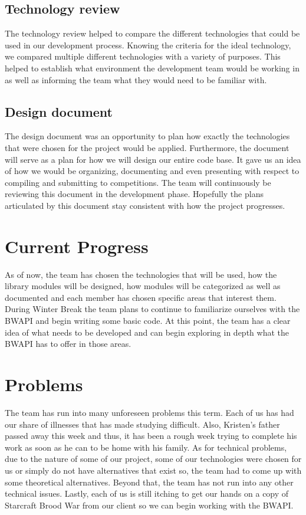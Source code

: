\documentclass[10pt,letterpaper,onecolumn,draftclsnofoot]{IEEEtran}
\begin{document}
\subsection{Technology review}
The technology review helped to compare the different technologies that could be used in our development process. Knowing the criteria for the ideal technology, we compared multiple different technologies with a variety of purposes. This helped to establish what environment the development team would be working in as well as informing the team what they would need to be familiar with.

\subsection{Design document}
The design document was an opportunity to plan how exactly the technologies that were chosen for the project would be applied. Furthermore, the document will serve as a plan for how we will design our entire code base. It gave us an idea of how we would be organizing, documenting and even presenting with respect to compiling and submitting to competitions. The team will continuously be reviewing this document in the development phase. Hopefully the plans articulated by this document stay consistent with how the project progresses. 

\section{Current Progress}
As of now, the team has chosen the technologies that will be used, how the library modules will be designed, how modules will be categorized as well as documented and each member has chosen specific areas that interest them. During Winter Break the team plans to continue to familiarize ourselves with the BWAPI and begin writing some basic code. At this point, the team has a clear idea of what needs to be developed and can begin exploring in depth what the BWAPI has to offer in those areas.

\section{Problems}
The team has run into many unforeseen problems this term. Each of us has had our share of illnesses that has made studying difficult. Also, Kristen's father passed away this week and thus, it has been a rough week trying to complete his work as soon as he can to be home with his family. As for technical problems, due to the nature of some of our project, some of our technologies were chosen for us or simply do not have alternatives that exist so, the team had to come up with some theoretical alternatives. Beyond that, the team has not run into any other technical issues. Lastly, each of us is still itching to get our hands on a copy of Starcraft Brood War from our client so we can begin working with the BWAPI.
\end{document}
